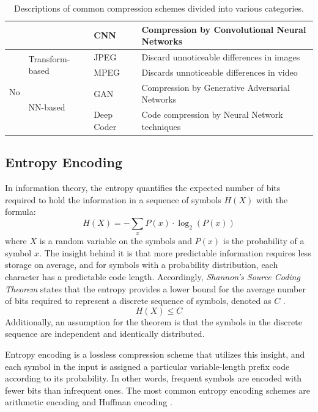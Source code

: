 \begin{table}[H]
{{\begin{tabular}{|l|l|l|l|}
 &  & CNN & Compression by Convolutional Neural Networks \\ \hline
\multirow{4}{*}{No} & \multirow{2}{*}{Transform-based} & JPEG & Discard unnoticeable differences in images \\ \cline{3-4} 
 &  & MPEG & Discards unnoticeable differences in video \\ \cline{2-4} 
 & \multirow{2}{*}{NN-based} & GAN & Compression by Generative Adversarial Networks \\ \cline{3-4} 
 &  & Deep Coder & Code compression by Neural Network techniques \\ \hline
\end{tabular}%
}}
\caption{Descriptions of common compression schemes divided into various categories.}
\label{table:compalgos}
\end{table}

\subsection{Entropy Encoding}
In information theory, the entropy quantifies the expected number of bits required to hold the information in a sequence of symbols \(H(X)\) with the formula: 
\begin{equation}
    H(X) = - \sum_{x}  P(x) \cdot \log_2(P(x))
    \label{eq:entropy}
\end{equation} where $X$ is a random variable on the symbols and \(P(x)\) is the probability of a symbol \(x\). The insight behind it is that more predictable information requires less storage on average, and for symbols with a probability distribution, each character has a predictable code length. Accordingly, 
\textit{Shannon's Source Coding Theorem} states that the entropy provides a lower bound for the average number of bits required to represent a discrete sequence of symbols, denoted as \(C\)  \cite{shannon}.
\begin{equation}
   H(X) \leq C
    \label{eq:entropyoptimal}
\end{equation} Additionally, an assumption for the theorem is that the symbols in the discrete sequence are independent and identically distributed.

Entropy encoding is a lossless compression scheme that utilizes this insight, and each symbol in the input is assigned a particular variable-length prefix code according to its probability. In other words, frequent symbols are encoded with fewer bits than infrequent ones. The most common entropy encoding schemes are arithmetic encoding and Huffman encoding \cite{Entropy2, entropyEncoding}.


